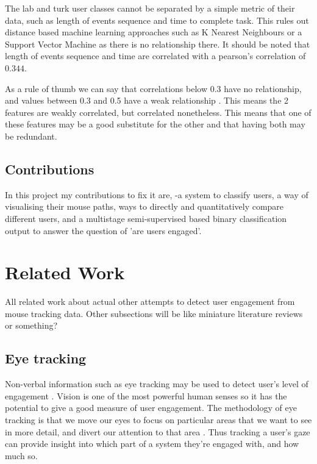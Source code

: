 \documentclass{article}
\begin{document}
The lab and turk user classes cannot be separated by a simple metric of their data, such as length of events sequence and time to complete task.
This rules out distance based machine learning approaches such as K Nearest Neighbours or a Support Vector Machine as there is no relationship there.
It should be noted that length of events sequence and time are correlated with a pearson's correlation of $0.344$.

As a rule of thumb we can say that correlations below 0.3 have no relationship, and values between 0.3 and 0.5 have a weak relationship \cite{mindrila2017scatterplots}.
This means the 2 features are weakly correlated, but correlated nonetheless.
This means that one of these features may be a good substitute for the other and that having both may be redundant.

\subsection{Contributions}

In this project my contributions to fix it are, -a system to classify users, a way of visualising their mouse paths, ways to directly and quantitatively compare different users, and a multistage semi-supervised based binary classification output to answer the question of 'are users engaged'.

\section{Related Work}


All related work about actual other attempts to detect user engagement from mouse tracking data.
Other subsections will be like miniature literature reviews or something?


\subsection{Eye tracking}

Non-verbal information such as eye tracking may be used to detect user’s level of engagement \cite{lala2017detection}.
Vision is one of the most powerful human senses so it has the potential to give a good measure of user engagement. 
The methodology of eye tracking is that we move our eyes to focus on particular areas that we want to see in more detail, and divert our attention to that area \cite{duchowski2007eye}. 
Thus tracking a user’s gaze can provide insight into which part of a system they’re engaged with, and how much so.
\end{document}
